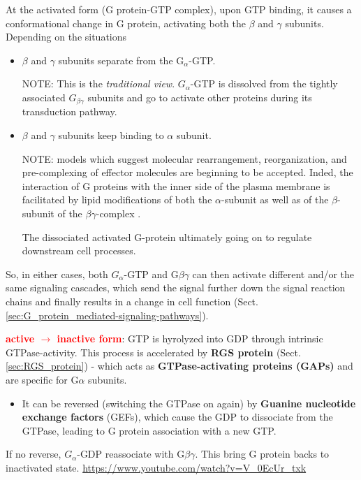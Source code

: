 \begin{itemize}

At the activated form (G protein-GTP complex), upon GTP binding, it causes a
conformational change in G protein, activating both the $\beta$ and $\gamma$
subunits. Depending on the situations
\begin{itemize}
  \item $\beta$ and $\gamma$ subunits separate from the G$_\alpha$-GTP.
  
NOTE: This is the {\it traditional view}.  
$G_\alpha$-GTP is dissolved from the tightly associated
$G_{\beta\gamma}$ subunits and go to activate other proteins during its
transduction pathway.
  
  \item $\beta$ and $\gamma$ subunits keep binding to $\alpha$ subunit.

NOTE: models which suggest molecular rearrangement, reorganization, and
pre-complexing of effector molecules are beginning to be accepted.
Inded, the interaction of G proteins with the inner side of the plasma membrane
is facilitated by lipid modifications of both the $\alpha$-subunit as well as of
the $\beta$-subunit of the $\beta\gamma$-complex \cite{Wettschureck2005}.

The dissociated activated G-protein ultimately going on to regulate downstream
cell processes. 

\end{itemize}
So, in either cases,  both $G_\alpha$-GTP and G$\beta\gamma$ can then activate
different and/or the same signaling cascades, which send the signal
further down the signal reaction chains and finally results in a change in cell
function (Sect.\ref{sec:G_protein_mediated-signaling-pathways}).

\end{itemize}

\textcolor{red}{\bf  active $\rightarrow$ inactive form}: GTP is hyrolyzed into
GDP through intrinsic GTPase-activity. This process is accelerated by {\bf RGS protein}
(Sect.\ref{sec:RGS_protein}) - which acts as {\bf GTPase-activating proteins
(GAPs)} and are specific for G$\alpha$ subunits.
\begin{itemize}
  \item It can be reversed (switching the GTPase on again) by {\bf Guanine
  nucleotide exchange factors} (GEFs), which cause the GDP to dissociate from the GTPase, leading to
G protein association with a new GTP.
\end{itemize}
If no reverse, $G_\alpha$-GDP reassociate with G$\beta\gamma$.  This bring G
protein backs to inactivated state.
\url{https://www.youtube.com/watch?v=V_0EcUr_txk}

